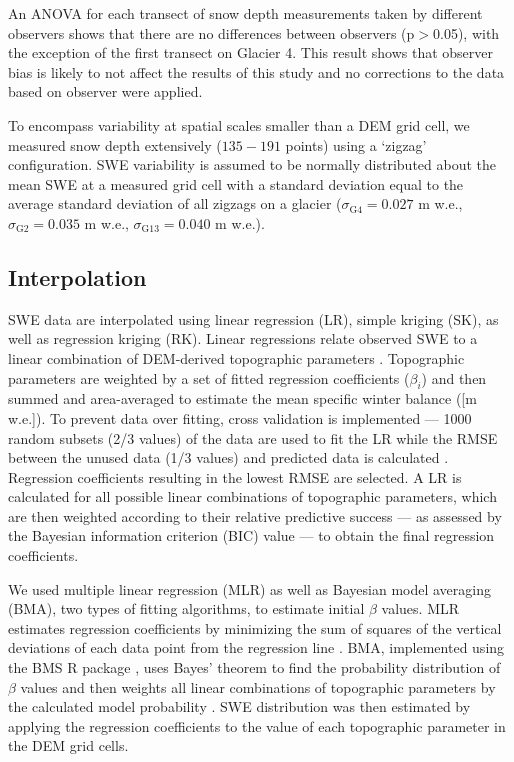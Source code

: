 \documentclass[twocolumn,letterpaper]{igs}
\begin{document}
An ANOVA for each transect of snow depth measurements taken by different observers
shows that there are no differences between observers (p$>$0.05), with the exception of the first transect on Glacier 4. This result shows that observer bias is likely to not affect the results of this study and no corrections to the data based on observer were applied.

To encompass variability at spatial scales smaller than a DEM grid cell, we measured snow depth extensively ($135-191$ points) using a `zigzag' configuration. SWE variability is assumed to be normally distributed about the mean SWE at a measured grid cell with a standard deviation equal to the average standard deviation of all zigzags on a glacier ($\sigma_{\mathrm{G4}} =  0.027$ m w.e., $\sigma_{\mathrm{G2}} =  0.035$ m w.e., $\sigma_{\mathrm{G13}} =  0.040$ m w.e.).

\subsection{Interpolation}

SWE data are interpolated using linear regression (LR), simple kriging (SK), as well as regression kriging (RK). Linear regressions relate observed SWE to a linear combination of DEM-derived topographic parameters \citep{Davis1986}. Topographic parameters are weighted by a set of fitted regression coefficients ($\beta_i$) and then summed and area-averaged to estimate the mean specific winter balance ([m w.e.]). To prevent data over fitting, cross validation is implemented --- 1000 random subsets (2/3 values) of the data are used to fit the LR while the RMSE between the unused data (1/3 values) and predicted data is calculated \citep{Kohavi1995}. Regression coefficients resulting in the lowest RMSE are selected. A LR is calculated for all possible linear combinations of topographic parameters, which are then weighted according to their relative predictive success --- as assessed by the Bayesian information criterion (BIC) value \citep{Burnham2004}--- to obtain the final regression coefficients. 

We used multiple linear regression (MLR) as well as Bayesian model averaging (BMA), two types of fitting algorithms, to estimate initial $\beta$ values. MLR estimates regression coefficients by minimizing the sum of squares of the vertical deviations of each data point from the regression line \citep{Davis1986}. BMA, implemented using the BMS R package \citep{Zeugner2015}, uses Bayes' theorem to find the probability distribution of $\beta$ values and then weights all linear combinations of topographic parameters by the calculated model probability \citep{Raftery1997, Williams1998,Wasserman2000}. SWE distribution was then estimated by applying the regression coefficients to the value of each topographic parameter in the DEM grid cells. 
\end{document}
